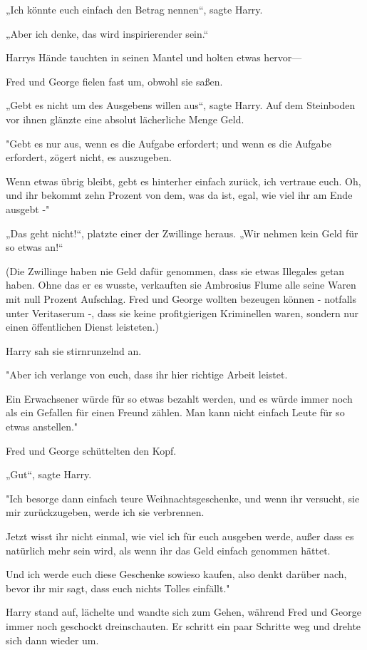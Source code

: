 {„Ich könnte euch einfach den Betrag nennen“, sagte Harry.

„Aber ich denke, das wird inspirierender sein.“

Harrys Hände tauchten in seinen Mantel und holten etwas hervor—

Fred und George fielen fast um, obwohl sie saßen.

„Gebt es nicht um des Ausgebens willen aus“, sagte Harry. Auf dem Steinboden vor ihnen glänzte eine absolut lächerliche Menge Geld.

"Gebt es nur aus, wenn es die Aufgabe erfordert; und wenn es die Aufgabe erfordert, zögert nicht, es auszugeben.

Wenn etwas übrig bleibt, gebt es hinterher einfach zurück, ich vertraue euch. Oh, und ihr bekommt zehn Prozent von dem, was da ist, egal, wie viel ihr am Ende ausgebt -"

„Das geht nicht!“, platzte einer der Zwillinge heraus. „Wir nehmen kein Geld für so etwas an!“

(Die Zwillinge haben nie Geld dafür genommen, dass sie etwas Illegales getan haben. Ohne das er es wusste, verkauften sie Ambrosius Flume alle seine Waren mit null Prozent Aufschlag. Fred und George wollten bezeugen können - notfalls unter Veritaserum -, dass sie keine profitgierigen Kriminellen waren, sondern nur einen öffentlichen Dienst leisteten.)

Harry sah sie stirnrunzelnd an.

"Aber ich verlange von euch, dass ihr hier richtige Arbeit leistet.

Ein Erwachsener würde für so etwas bezahlt werden, und es würde immer noch als ein Gefallen für einen Freund zählen. Man kann nicht einfach Leute für so etwas anstellen."

Fred und George schüttelten den Kopf.

„Gut“, sagte Harry.

"Ich besorge dann einfach teure Weihnachtsgeschenke, und wenn ihr versucht, sie mir zurückzugeben, werde ich sie verbrennen.

Jetzt wisst ihr nicht einmal, wie viel ich für euch ausgeben werde, außer dass es natürlich mehr sein wird, als wenn ihr das Geld einfach genommen hättet.

Und ich werde euch diese Geschenke sowieso kaufen, also denkt darüber nach, bevor ihr mir sagt, dass euch nichts Tolles einfällt."

Harry stand auf, lächelte und wandte sich zum Gehen, während Fred und George immer noch geschockt dreinschauten. Er schritt ein paar Schritte weg und drehte sich dann wieder um.

}
